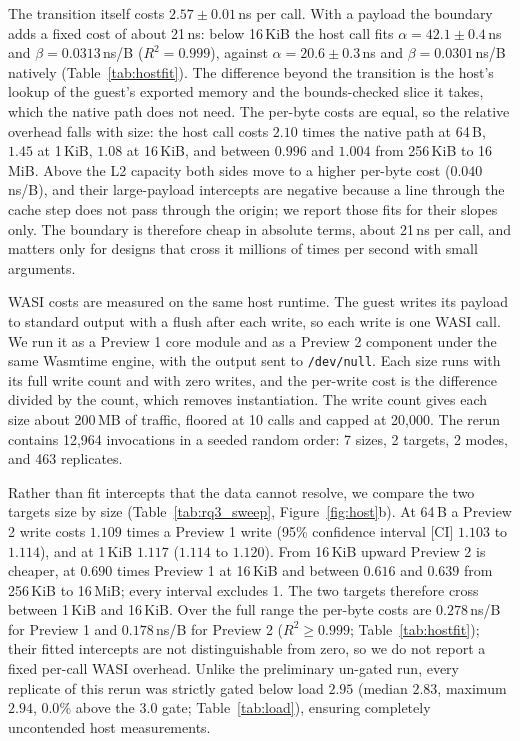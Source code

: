 \documentclass{ws-jcsc}
\begin{document}
The transition itself costs $2.57\pm0.01$\,ns per call. With a payload the boundary adds a fixed cost of about 21\,ns: below 16\,KiB the host call fits $\alpha=42.1\pm0.4$\,ns and $\beta=0.0313$\,ns/B ($R^2=0.999$), against $\alpha=20.6\pm0.3$\,ns and $\beta=0.0301$\,ns/B natively (Table~\ref{tab:hostfit}). The difference beyond the transition is the host's lookup of the guest's exported memory and the bounds-checked slice it takes, which the native path does not need. The per-byte costs are equal, so the relative overhead falls with size: the host call costs $2.10$ times the native path at 64\,B, $1.45$ at 1\,KiB, $1.08$ at 16\,KiB, and between $0.996$ and $1.004$ from 256\,KiB to 16\,MiB. Above the L2 capacity both sides move to a higher per-byte cost ($0.040$\,ns/B), and their large-payload intercepts are negative because a line through the cache step does not pass through the origin; we report those fits for their slopes only. The boundary is therefore cheap in absolute terms, about 21\,ns per call, and matters only for designs that cross it millions of times per second with small arguments.

WASI costs are measured on the same host runtime. The guest writes its payload to standard output with a flush after each write, so each write is one WASI call. We run it as a Preview 1 core module and as a Preview 2 component under the same Wasmtime engine, with the output sent to \texttt{/dev/null}. Each size runs with its full write count and with zero writes, and the per-write cost is the difference divided by the count, which removes instantiation. The write count gives each size about 200\,MB of traffic, floored at 10 calls and capped at 20{,}000. The rerun contains 12{,}964 invocations in a seeded random order: 7 sizes, 2 targets, 2 modes, and 463 replicates.

Rather than fit intercepts that the data cannot resolve, we compare the two targets size by size (Table~\ref{tab:rq3_sweep}, Figure~\ref{fig:host}b). At 64\,B a Preview 2 write costs $1.109$ times a Preview 1 write (95\% confidence interval [CI] $1.103$ to $1.114$), and at 1\,KiB $1.117$ ($1.114$ to $1.120$). From 16\,KiB upward Preview 2 is cheaper, at $0.690$ times Preview 1 at 16\,KiB and between $0.616$ and $0.639$ from 256\,KiB to 16\,MiB; every interval excludes 1. The two targets therefore cross between 1\,KiB and 16\,KiB. Over the full range the per-byte costs are $0.278$\,ns/B for Preview 1 and $0.178$\,ns/B for Preview 2 ($R^2\ge0.999$; Table~\ref{tab:hostfit}); their fitted intercepts are not distinguishable from zero, so we do not report a fixed per-call WASI overhead. Unlike the preliminary un-gated run, every replicate of this rerun was strictly gated below load $2.95$ (median $2.83$, maximum $2.94$, $0.0\%$ above the $3.0$ gate; Table~\ref{tab:load}), ensuring completely uncontended host measurements.
\end{document}
